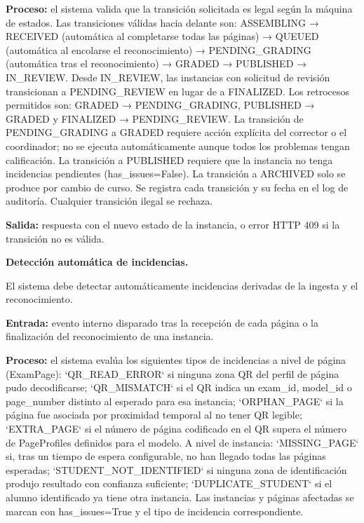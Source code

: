 \begin{functional}
\begin{functional}
    \textbf{Proceso:} el sistema valida que la transición solicitada es legal según la máquina de estados. Las transiciones válidas hacia delante son: ASSEMBLING → RECEIVED (automática al completarse todas las páginas) → QUEUED (automática al encolarse el reconocimiento) → PENDING\_GRADING (automática tras el reconocimiento) → GRADED → PUBLISHED → IN\_REVIEW. Desde IN\_REVIEW, las instancias con solicitud de revisión transicionan a PENDING\_REVIEW en lugar de a FINALIZED. Los retrocesos permitidos son: GRADED → PENDING\_GRADING, PUBLISHED → GRADED y FINALIZED → PENDING\_REVIEW. La transición de PENDING\_GRADING a GRADED requiere acción explícita del corrector o el coordinador; no se ejecuta automáticamente aunque todos los problemas tengan calificación. La transición a PUBLISHED requiere que la instancia no tenga incidencias pendientes (has\_issues=False). La transición a ARCHIVED solo se produce por cambio de curso. Se registra cada transición y su fecha en el log de auditoría. Cualquier transición ilegal se rechaza.

    \textbf{Salida:} respuesta con el nuevo estado de la instancia, o error HTTP 409 si la transición no es válida.

    \item \textbf{Detección automática de incidencias.}

    El sistema debe detectar automáticamente incidencias derivadas de la ingesta y el reconocimiento.

    \textbf{Entrada:} evento interno disparado tras la recepción de cada página o la finalización del reconocimiento de una instancia.

    \textbf{Proceso:} el sistema evalúa los siguientes tipos de incidencias a nivel de página (ExamPage): `QR\_READ\_ERROR` si ninguna zona QR del perfil de página pudo decodificarse; `QR\_MISMATCH` si el QR indica un exam\_id, model\_id o page\_number distinto al esperado para esa instancia; `ORPHAN\_PAGE` si la página fue asociada por proximidad temporal al no tener QR legible; `EXTRA\_PAGE` si el número de página codificado en el QR supera el número de PageProfiles definidos para el modelo. A nivel de instancia: `MISSING\_PAGE` si, tras un tiempo de espera configurable, no han llegado todas las páginas esperadas; `STUDENT\_NOT\_IDENTIFIED` si ninguna zona de identificación produjo resultado con confianza suficiente; `DUPLICATE\_STUDENT` si el alumno identificado ya tiene otra instancia. Las instancias y páginas afectadas se marcan con has\_issues=True y el tipo de incidencia correspondiente.


\end{functional}
\end{functional}
